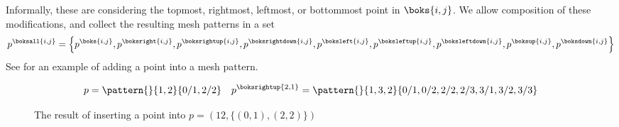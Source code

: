 Informally, these are considering the topmost, rightmost, leftmost, or bottommost point in \(\boks{i,j}\).
We allow composition of these modifications, and collect the resulting mesh patterns in a set
\begin{equation*}
p^\boksall{i,j}=\left\{
p^\boks{i,j},
p^\boksright{i,j},
p^\boksrightup{i,j},
p^\boksrightdown{i,j},
p^\boksleft{i,j},
p^\boksleftup{i,j},
p^\boksleftdown{i,j},
p^\boksup{i,j},
p^\boksdown{i,j}\right\}
\end{equation*}
See  for an example of adding a point into a mesh pattern.

\begin{figure}
\begin{equation*}
p = \pattern{}{1,2}{0/1,2/2} \quad
p^\boksrightup{2,1}
= \pattern{}{1,3,2}{0/1,0/2,2/2,2/3,3/1,3/2,3/3}
\end{equation*}
\caption{The result of inserting a point into \(p=(12,\{(0,1),(2,2)\})\)}
\label{fig:addp}
\end{figure}

